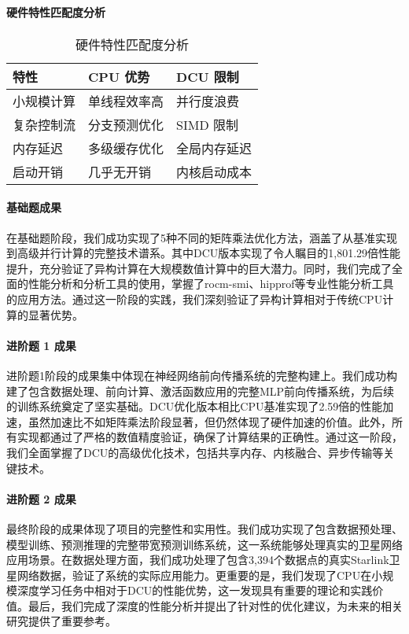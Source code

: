 \documentclass[a4paper]{article}
\begin{document}
\paragraph{硬件特性匹配度分析}

\begin{table}[h]
\centering
\begin{tabular}{@{}lll@{}}
\toprule
特性 & CPU 优势 & DCU 限制 \\
\midrule
小规模计算 & 单线程效率高 & 并行度浪费 \\
复杂控制流 & 分支预测优化 & SIMD 限制 \\
内存延迟 & 多级缓存优化 & 全局内存延迟 \\
启动开销 & 几乎无开销 & 内核启动成本 \\
\bottomrule
\end{tabular}
\caption{硬件特性匹配度分析}
\end{table}

\paragraph{基础题成果}

在基础题阶段，我们成功实现了5种不同的矩阵乘法优化方法，涵盖了从基准实现到高级并行计算的完整技术谱系。其中DCU版本实现了令人瞩目的1,801.29倍性能提升，充分验证了异构计算在大规模数值计算中的巨大潜力。同时，我们完成了全面的性能分析和分析工具的使用，掌握了rocm-smi、hipprof等专业性能分析工具的应用方法。通过这一阶段的实践，我们深刻验证了异构计算相对于传统CPU计算的显著优势。

\paragraph{进阶题 1 成果}

进阶题1阶段的成果集中体现在神经网络前向传播系统的完整构建上。我们成功构建了包含数据处理、前向计算、激活函数应用的完整MLP前向传播系统，为后续的训练系统奠定了坚实基础。DCU优化版本相比CPU基准实现了2.59倍的性能加速，虽然加速比不如矩阵乘法阶段显著，但仍然体现了硬件加速的价值。此外，所有实现都通过了严格的数值精度验证，确保了计算结果的正确性。通过这一阶段，我们全面掌握了DCU的高级优化技术，包括共享内存、内核融合、异步传输等关键技术。

\paragraph{进阶题 2 成果}

最终阶段的成果体现了项目的完整性和实用性。我们成功实现了包含数据预处理、模型训练、预测推理的完整带宽预测训练系统，这一系统能够处理真实的卫星网络应用场景。在数据处理方面，我们成功处理了包含3,394个数据点的真实Starlink卫星网络数据，验证了系统的实际应用能力。更重要的是，我们发现了CPU在小规模深度学习任务中相对于DCU的性能优势，这一发现具有重要的理论和实践价值。最后，我们完成了深度的性能分析并提出了针对性的优化建议，为未来的相关研究提供了重要参考。
\end{document}
